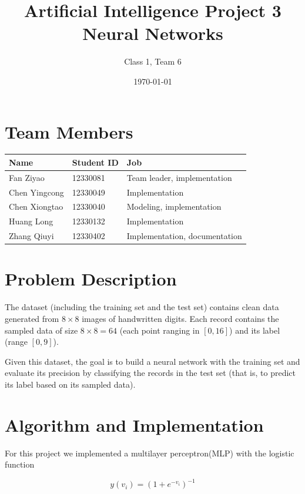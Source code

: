 \documentclass{article}
\begin{document}
\title{
Artificial Intelligence Project 3 \\
Neural Networks
}
\author{Class 1, Team 6}
\date{\today}
\maketitle
\tableofcontents

\section{Team Members}

\begin{table}[H]
\centering
\begin{tabular}{l l l}
Name & Student ID  & Job\\
\hline
Fan Ziyao & 12330081 & Team leader, implementation\\
Chen Yingcong & 12330049 & Implementation \\
Chen Xiongtao & 12330040 & Modeling, implementation \\
Huang Long & 12330132 & Implementation \\
Zhang Qiuyi & 12330402 & Implementation, documentation

\end{tabular}
\end{table}

\section{Problem Description}

The dataset (including the training set and the test set) contains clean data generated from $8 \times 8$ images of handwritten digits. Each record contains the sampled data of size $8 \times 8 = 64$ (each point ranging in $[0, 16]$) and its label (range $[0, 9]$).

Given this dataset, the goal is to build a neural network with the training set and evaluate its precision by classifying the records in the test set (that is, to predict its label based on its sampled data).

\section{Algorithm and Implementation}

For this project we implemented a multilayer perceptron(MLP) with the logistic function

$$y(v_i) = (1+e^{-v_i})^{-1}$$
\end{document}
